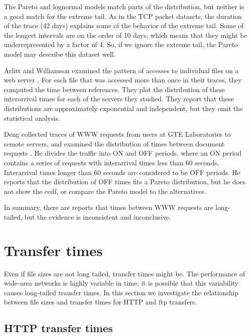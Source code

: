 \documentclass{elsart}
\begin{document}
The Pareto and lognormal models match parts of the distribution, but
neither is a good match for the extreme tail.  As in the TCP packet
datasets, the duration of the trace (42 days) explains some of the
behavior of the extreme tail.  Some of the longest intervals are on
the order of 10 days, which means that they might be underrepresented
by a factor of 4.  So, if we ignore the extreme tail, the Pareto model
may describe this dataset well.

Arlitt and Williamson examined the pattern of accesses to individual
files on a web server \cite{ArlittWilliamson96}.  For each file that
was accessed more than once in their traces, they computed the
time between references.  They plot the distribution of these
interarrival times for each of the servers they studied.  They
report that these distributions are approximately exponential
and independent, but they omit the statistical analysis.

Deng collected traces of WWW requests from users at GTE Laboratories
to remote servers, and examined the distribution of times between
document requests \cite{Deng96Empirical}.  He divides the traffic into
ON and OFF periods, where an ON period contains a series of requests
with interarrival times less than 60 seconds.  Interarrival times
longer than 60 seconds are considered to be OFF periods.  He reports
that the distribution of OFF times fits a Pareto distribution, but
he does not show the ccdf, or compare the Pareto model to the alternatives.

In summary, there are reports that times between WWW requests
are long-tailed, but the evidence is inconsistent and inconclusive.



\section{Transfer times}
\label{transfer}

Even if file sizes are not long tailed, transfer times might be.
The performance of wide-area networks is highly variable in time; it
is possible that this variability causes long-tailed transfer times.
In this section we investigate the relationship between file sizes
and transfer times for HTTP and ftp transfers.


\subsection {HTTP transfer times}
\label{www}
\end{document}
